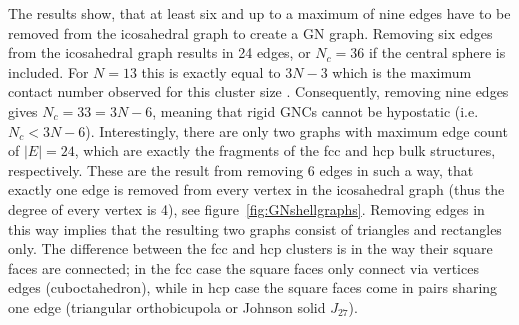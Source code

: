 The results show, that at least six and up to a maximum of nine edges have to be
removed from the icosahedral graph to create a \ac{GN} graph. Removing six edges
from the icosahedral graph results in 24 edges, or $N_c=36$ if the central
sphere is included. For $N=13$ this is exactly equal to $3N-3$ which is the
maximum contact number observed for this cluster size
\autocite{Hoy_Structuredynamicsmodel_2015,Holmes-Cerfon_EnumeratingRigidSphere_2016}.
Consequently, removing nine edges gives $N_c=33=3N-6$, meaning that rigid
\acp{GNC} cannot be hypostatic (i.e. $N_c < 3N-6$). Interestingly, there are
only two graphs with maximum edge count of $|E|=24$, which are exactly the
fragments of the \acf{fcc} and \acf{hcp} bulk structures, respectively. These
are the result from removing 6 edges in such a way, that exactly one edge is
removed from every vertex in the icosahedral graph (thus the degree of every
vertex is 4), see figure~\ref{fig:GNshellgraphs}. Removing edges in this way
implies that the resulting two graphs consist of triangles and rectangles only.
The difference between the \ac{fcc} and \ac{hcp} clusters is in the way their
square faces are connected; in the \ac{fcc} case the square faces only connect
via vertices edges (cuboctahedron), while in \ac{hcp} case the square faces come
in pairs sharing one edge (triangular orthobicupola or Johnson solid
$J_{27}$)\autocite{Kusner_ConfigurationSpacesEqual_2018}.


